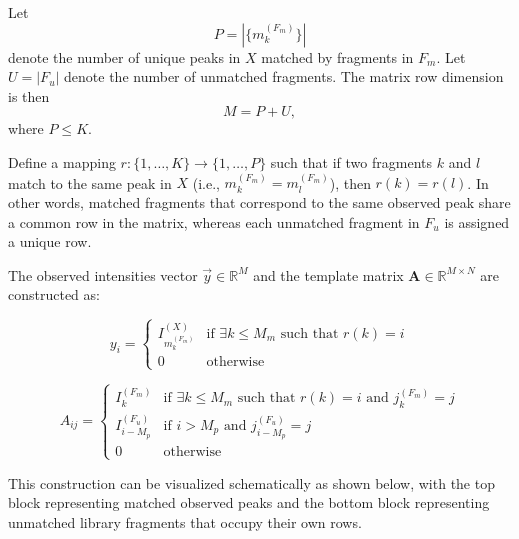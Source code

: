 \documentclass[pdflatex,sn-nature]{sn-jnl}
\begin{document}
Let
\[
P = \left|\{m_k^{(F_m)}\}\right|
\]
denote the number of unique peaks in $X$ matched by fragments in $F_m$. Let $U = |F_u|$ denote the number of unmatched fragments. The matrix row dimension is then
\[
M = P + U,
\]
where $P \leq K$.

Define a mapping $r : \{1,\ldots,K\} \rightarrow \{1,\ldots,P\}$ such that if two fragments $k$ and $l$ match to the same peak in $X$ (i.e., $m_k^{(F_m)} = m_l^{(F_m)}$), then $r(k) = r(l)$. In other words, matched fragments that correspond to the same observed peak share a common row in the matrix, whereas each unmatched fragment in $F_u$ is assigned a unique row.




The observed intensities vector $\vec{y} \in \mathbb{R}^{M}$ and the template matrix $\mathbf{A} \in \mathbb{R}^{M \times N}$ are constructed as:

\begin{equation}
y_i =
\begin{cases}
I_{m_k^{(F_m)}}^{(X)} & \text{if } \exists k \leq M_m \text{ such that } r(k) = i \\
0 & \text{otherwise}
\end{cases}
\end{equation}

\begin{equation}
A_{ij} =
\begin{cases}
I_k^{(F_m)} & \text{if } \exists k \leq M_m \text{ such that } r(k) = i \text{ and } j_k^{(F_m)} = j \\
I_{i - M_p}^{(F_u)} & \text{if } i > M_p \text{ and } j_{i - M_p}^{(F_u)} = j \\
0 & \text{otherwise}
\end{cases}
\end{equation}

This construction can be visualized schematically as shown below, with the top block representing matched observed peaks and the bottom block representing unmatched library fragments that occupy their own rows.
\end{document}
